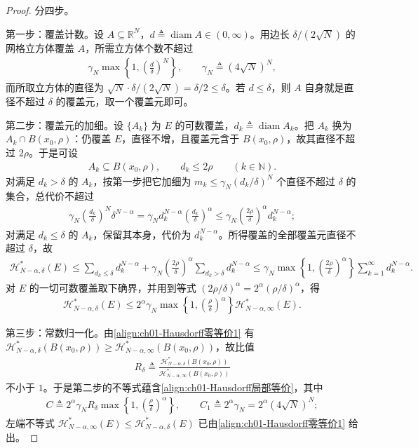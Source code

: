 \documentclass[../../main.tex]{subfiles}%
\begin{document}
\begin{proof}
分四步。

第一步：覆盖计数。设 $A\subseteq\mathbb{R}^N$，$d\triangleq\operatorname{diam}A\in(0,\infty)$。用边长 $\delta/(2\sqrt N)$ 的网格立方体覆盖 $A$，所需立方体个数不超过
\begin{align*}
\gamma_N\max\left\{1,\left(\frac{d}{\delta}\right)^N\right\},\qquad \gamma_N\triangleq(4\sqrt N)^N ,
\end{align*}
而所取立方体的直径为 $\sqrt N\cdot\delta/(2\sqrt N)=\delta/2\leqslant\delta$。若 $d\leqslant\delta$，则 $A$ 自身就是直径不超过 $\delta$ 的覆盖元，取一个覆盖元即可。

第二步：覆盖元的加细。设 $\{A_k\}$ 为 $E$ 的可数覆盖，$d_k\triangleq\operatorname{diam}A_k$。把 $A_k$ 换为 $A_k\cap B(x_0,\rho)$：仍覆盖 $E$，直径不增，且覆盖元含于 $B(x_0,\rho)$，故其直径不超过 $2\rho$。于是可设
\begin{align*}
A_k\subseteq B(x_0,\rho),\qquad d_k\leqslant2\rho\qquad(k\in\mathbb{N}).
\end{align*}
对满足 $d_k>\delta$ 的 $A_k$，按第一步把它加细为 $m_k\leqslant\gamma_N(d_k/\delta)^N$ 个直径不超过 $\delta$ 的集合，总代价不超过
\begin{align*}
\gamma_N\left(\frac{d_k}{\delta}\right)^N\delta^{N-\alpha}=\gamma_Nd_k^{N-\alpha}\left(\frac{d_k}{\delta}\right)^\alpha\leqslant\gamma_N\left(\frac{2\rho}{\delta}\right)^\alpha d_k^{N-\alpha};
\end{align*}
对满足 $d_k\leqslant\delta$ 的 $A_k$，保留其本身，代价为 $d_k^{N-\alpha}$。所得覆盖的全部覆盖元直径不超过 $\delta$，故
\begin{align*}
\mathcal{H}_{N-\alpha,\delta}^*(E)\leqslant\sum_{d_k\leqslant\delta}d_k^{N-\alpha}+\gamma_N\left(\frac{2\rho}{\delta}\right)^\alpha\sum_{d_k>\delta}d_k^{N-\alpha}\leqslant\gamma_N\max\left\{1,\left(\frac{2\rho}{\delta}\right)^\alpha\right\}\sum_{k=1}^\infty d_k^{N-\alpha}.
\end{align*}
对 $E$ 的一切可数覆盖取下确界，并用到等式 $(2\rho/\delta)^\alpha=2^\alpha(\rho/\delta)^\alpha$，得
\begin{align*}
\mathcal{H}_{N-\alpha,\delta}^*(E)\leqslant2^\alpha\gamma_N\max\left\{1,\left(\frac{\rho}{\delta}\right)^\alpha\right\}\mathcal{H}_{N-\alpha,\infty}^*(E).
\end{align*}

第三步：常数归一化。由\eqref{align:ch01-Hausdorff零等价1} 有 $\mathcal{H}_{N-\alpha,\delta}^*(B(x_0,\rho))\geqslant\mathcal{H}_{N-\alpha,\infty}^*(B(x_0,\rho))$，故比值
\begin{align*}
R_\delta\triangleq\frac{\mathcal{H}_{N-\alpha,\delta}^*(B(x_0,\rho))}{\mathcal{H}_{N-\alpha,\infty}^*(B(x_0,\rho))}
\end{align*}
不小于 $1$。于是第二步的不等式蕴含\eqref{align:ch01-Hausdorff局部等价}，其中
\begin{align*}
C\triangleq2^\alpha\gamma_NR_\delta\max\left\{1,\left(\frac{\rho}{\delta}\right)^\alpha\right\},\qquad C_1\triangleq2^\alpha\gamma_N=2^\alpha(4\sqrt N)^N ;
\end{align*}
左端不等式 $\mathcal{H}_{N-\alpha,\infty}^*(E)\leqslant\mathcal{H}_{N-\alpha,\delta}^*(E)$ 已由\eqref{align:ch01-Hausdorff零等价1} 给出。


\end{proof}
\end{document}
